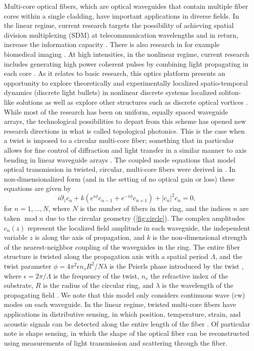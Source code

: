 \documentclass[11pt,reqno]{amsart}
\DeclareMathOperator{\md}{mod}
\begin{document}
Multi-core optical fibers, which are optical waveguides that contain multiple fiber cores within a single cladding, have important applications in diverse fields. In the linear regime, current research targets the possibility of achieving spatial division multiplexing (SDM) at telecommunication wavelengths and in return, increase the information capacity \cite{azadeh}. There is also research in for example biomedical imaging \cite{Ortiz2018}. At high intensities, in the nonlinear regime, current research includes generating high power coherent pulses by combining light propagating in each core \cite{balakin}. As it relates to basic research, this optics platform presents an opportunity to explore theoretically \cite{ace} and experimentally \cite{minardi} localized spatio-temporal dynamics (discrete light bullets) in nonlinear discrete systems localized soliton-like solutions as well as explore  other structures such as discrete optical vortices \cite{pryamikov}. While most of the research has been on uniform, equally spaced waveguide arrays, the technological possibilities to depart from this scheme has opened new research directions in what is called topological photonics. This is the case when a twist is imposed to a circular multi-core fiber; something that in particular allows for fine control of diffraction and light transfer in a similar manner to axis bending in linear waveguide arrays \cite{Longhi2005}. The coupled mode equations that model optical transmission in twisted, circular, multi-core fibers were derived in \cite{Longhi2007,Longhi2007b,Garanovich2012}. In non-dimensionalized form (and in the setting of no optical gain or loss) these equations are given by
\begin{equation}\label{eq:coupledmode}
i \partial_z c_n + k \left(e^{i\phi}c_{n-1} + e^{-i\phi}c_{n+1} \right) + |c_n|^2 c_n = 0,
\end{equation}
for $n = 1, \dots, N$, where $N$ is the number of fibers in the ring, and the indices $n$ are taken $\md n$ due to the circular geometry (\cref{fig:circle}).
The complex amplitudes $c_n(z)$ represent the localized field amplitude in each waveguide, the independent variable $z$ is along the axis of propagation, and $k$ is the non-dimensional strength of the nearest-neighbor coupling of the waveguides in the ring. The entire fiber structure is twisted along the propagation axis with a spatial period $\Lambda$, and the twist parameter $\phi = 4 \pi^2 \epsilon n_s R^2/N \lambda$ is the Peierls phase introduced by the twist \cite{Longhi2007,Peierls1933}, where $\epsilon = 2 \pi / \Lambda$ is the frequency of the twist, $n_s$ the refractive index of the substrate, $R$ is the radius of the circular ring, and $\lambda$ is the wavelength of the propagating field \cite{castro2016,Parto2017}. We note that this model only considers continuous wave (cw) modes on each waveguide. In the linear regime, 
twisted multi-core fibers have applications in distributive sensing, in which position, temperature, strain, and acoustic signals can be detected along the entire length of the fiber \cite{Gannot2014,Westbrook2017}. Of particular note is shape sensing, in which the shape of the optical fiber can be reconstructed using measurements of light transmission and scattering through the fiber. 
\end{document}
